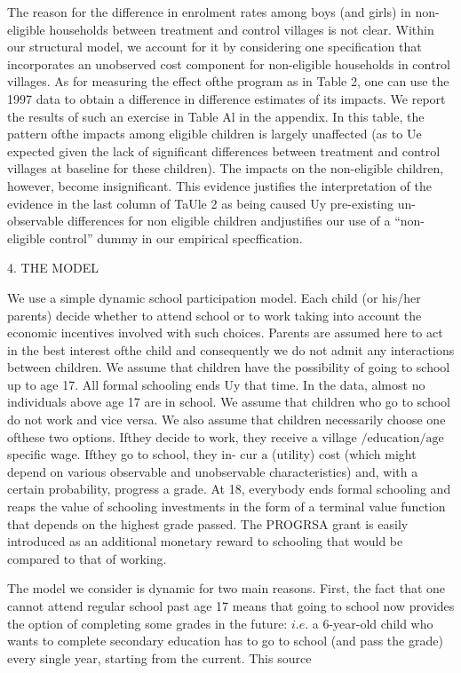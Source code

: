 The reason for the difference in enrolment rates among boys (and girls) in non-eligible households between treatment and control villages is not clear. Within our structural model, we account for it by considering one specification that incorporates an unobserved cost component for non-eligible households in control villages. As for measuring the effect ofthe program as in Table 2, one can use the 1997 data to obtain a difference in difference estimates of its impacts. We report the results of such an exercise in Table Al in the appendix. In this table, the pattern ofthe impacts among eligible children is largely unaffected (as to Ue expected given the lack of significant differences between treatment and control villages at baseline for these children). The impacts on the non-eligible children, however, become insignificant. This evidence justifies the interpretation of the evidence in the last column of TaUle 2 as being caused Uy pre-existing un- observable differences for non eligible children andjustifies our use of a ``non-eligible control'' dummy in our empirical specffication.

4. THE MODEL

We use a simple dynamic school participation model. Each child (or his/her parents) decide whether to attend school or to work taking into account the economic incentives involved with such choices. Parents are assumed here to act in the best interest ofthe child and consequently we do not admit any interactions between children. We assume that children have the possibility of going to school up to age 17. All formal schooling ends Uy that time. In the data, almost no individuals above age 17 are in school. We assume that children who go to school do not work and vice versa. We also assume that children necessarily choose one ofthese two options. Ifthey decide to work, they receive a village $/\mathrm{e}\mathrm{d}\mathrm{u}\mathrm{c}\mathrm{a}\mathrm{t}\mathrm{i}\mathrm{o}\mathrm{n}/\mathrm{a}\mathrm{g}\mathrm{e}$ specific wage. Ifthey go to school, they in- cur $\mathrm{a}$ (utility) cost (which might depend on various observable and unobservable characteristics) and, with a certain probability, progress a grade. At 18, everybody ends formal schooling and reaps the value of schooling investments in the form of a terminal value function that depends on the highest grade passed. The PROGRSA grant is easily introduced as an additional monetary reward to schooling that would be compared to that of working.

The model we consider is dynamic for two main reasons. First, the fact that one cannot attend regular school past age 17 means that going to school now provides the option of completing some grades in the future: $i.e$. a 6-year-old child who wants to complete secondary education has to go to school (and pass the grade) every single year, starting from the current. This source

